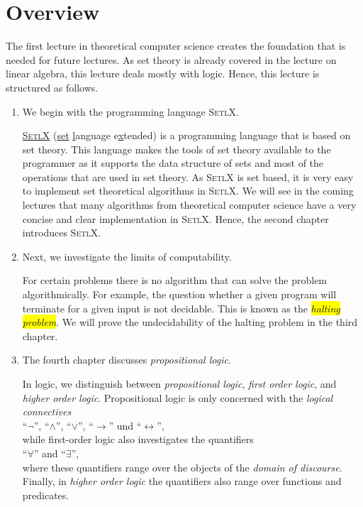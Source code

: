 \section{Overview} 
The first lecture in theoretical computer science creates the foundation that is needed for future lectures.
As set theory is already covered in the lecture on linear algebra, this lecture deals mostly with logic.
Hence, this lecture is structured as follows.
\begin{enumerate}
\item We begin with the programming language \textsc{SetlX}.

      \href{http://randoom.org/Software/SetlX}{\textsc{SetlX}} (\underline{set} \underline{l}anguage
      e\underline{x}tended) is a programming language that is based on set theory.  This language
      makes the tools of set theory available to the programmer as it supports the data structure of
      sets and most of the operations that are used in set theory.  As \textsc{SetlX} is set based,
      it is very easy to implement set theoretical algorithms in \textsc{SetlX}.  We will see in the
      coming lectures that many algorithms from theoretical computer science have a very concise
      and clear implementation in \textsc{SetlX}.  Hence, the second chapter introduces \textsc{SetlX}.
\item Next, we investigate the limits of computability.

      For certain problems there is no algorithm that can solve the problem algorithmically. 
      For example, the question whether a given program will terminate for a given input is not
      decidable.  This is known as the \colorbox{yellow}{\emph{halting problem}}.  We will prove the undecidability of
      the halting problem in the third chapter. 
\item The fourth chapter discusses \emph{propositional logic}.

      In logic, we distinguish between  \emph{propositional logic},
      \emph{first order logic}, and \emph{higher order logic}.  Propositional logic is only
      concerned with the \emph{logical connectives}
      \\[0.2cm]
      \hspace*{1.3cm}
      ``$\neg$'', ``$\wedge$'', ``$\vee$'', ``$\rightarrow$'' und ``$\leftrightarrow$'',
      \\[0.2cm]
      while first-order logic also investigates the quantifiers
      \\[0.2cm]
      \hspace*{1.3cm}
      ``$\forall$'' and ``$\exists$'',
      \\[0.2cm]
      where these quantifiers range over the objects of the \emph{domain of discourse}.
      Finally, in \emph{higher order logic} the quantifiers also range over functions and predicates.


\end{enumerate}

